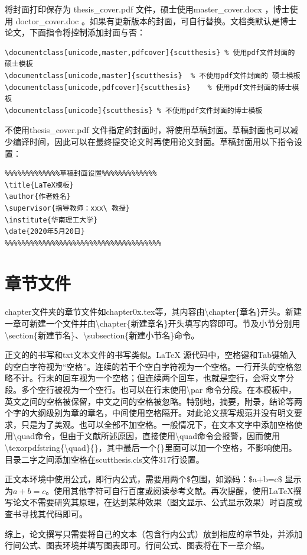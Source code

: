 将封面打印保存为 thesis\_cover.pdf 文件，硕士使用master\_cover.docx ，博士使用 doctor\_cover.doc 。如果有更新版本的封面，可自行替换。文档类默认是博士论文，下面指令将控制添加封面与否：
\begin{lstlisting}
\documentclass[unicode,master,pdfcover]{scutthesis}	% 使用pdf文件封面的 硕士模板
\documentclass[unicode,master]{scutthesis}	% 不使用pdf文件封面的 硕士模板
\documentclass[unicode,pdfcover]{scutthesis}	% 使用pdf文件封面的博士模板
\documentclass[unicode]{scutthesis}	% 不使用pdf文件封面的博士模板
\end{lstlisting}
不使用thesis\_cover.pdf 文件指定的封面时，将使用草稿封面。草稿封面也可以减少编译时间，因此可以在最终提交论文时再使用论文封面。草稿封面用以下指令设置：
\begin{lstlisting}
%%%%%%%%%%%%%草稿封面设置%%%%%%%%%%%%%	
\title{LaTeX模板}	
\author{作者姓名}	
\supervisor{指导教师：xxx\ 教授}	
\institute{华南理工大学}	
\date{2020年5月20日}
%%%%%%%%%%%%%%%%%%%%%%%%%%%%%%%%%%%%%
\end{lstlisting}
\section{章节文件}
chapter文件夹的章节文件如chapter0x.tex等，其内容由\textbackslash{}chapter\{章名\}开头。新建一章可新建一个文件并由\textbackslash{}chapter\{新建章名\}开头填写内容即可。节及小节分别用\textbackslash{}section\{新建节名\}、\textbackslash{}subsection\{新建小节名\}命令。

正文的的书写和txt文本文件的书写类似。\LaTeX{} 源代码中，空格键和Tab键输入的空白字符视为“空格”。连续的若干个空白字符视为一个空格。一行开头的空格忽略不计。行末的回车视为一个空格；但连续两个回车，也就是空行，会将文字分段。多个空行被视为一个空行。也可以在行末使用\textbackslash{}par 命令分段。在本模板中，英文之间的空格被保留，中文之间的空格被忽略。特别地，摘要，附录，结论等两个字的大纲级别为章的章名，中间使用空格隔开。对此论文撰写规范并没有明文要求，只是为了美观。也可以全部不加空格。一般情况下，在文本文字中添加空格使用\textbackslash{}quad命令，但由于文献\parencite{_d}所述原因，直接使用\textbackslash{}quad命令会报警，因而使用\textbackslash{}texorpdfstring\{\textbackslash{}quad\}\{\}，其中最后一个\{\}里面可以加一个空格，不影响使用。目录二字之间添加空格在scutthesis.cls文件317行设置。

正文本环境中使用公式，即行内公式，需要用两个\$包围，如源码：\$a+b=c\$ 显示为$a+b=c$。使用其他字符可自行百度或阅读参考文献。再次提醒，使用\LaTeX{}撰写论文不需要研究其原理，在达到某种效果（图文显示、公式显示效果）时百度或查书寻找其代码即可。

综上，论文撰写只需要将自己的文本（包含行内公式）放到相应的章节处，并添加行间公式、图表环境并填写图表即可。行间公式、图表将在下一章介绍。

